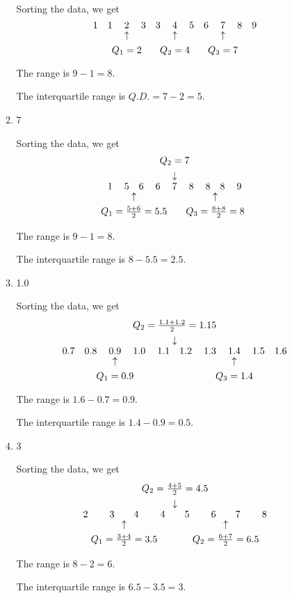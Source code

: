 \documentclass{report}
\newcommand\typel[2]{%
  \mathbin{\mathop{#1\kern0pt}%
    \limits_{\raisebox{3.6ex}{\hbox to0pt{\hss\strut$\uparrow$\hss}}\hbox to0pt{\hss#2\hss}}}
}
\newcommand\typem[2]{%
  \mathbin{\mathop{#1\kern0pt}%
    \limits^{\raisebox{3.6ex}{\hbox to0pt{\hss#2\hss}}\hbox to0pt{\hss\strut$\downarrow$\hss}}}
}
\begin{document}
\begin{multicols}{2}
\begin{enumerate}
\begin{enumerate}
                  Sorting the data, we get
                  \[1 \quad 1 \quad \typel{2}{$Q_1 = 2$} \quad 3 \quad 3 \quad \typel{4}{$Q_2 = 4$} \quad 5 \quad 6 \quad \typel{7}{$Q_3 = 7$} \quad 8 \quad 9\]

                  The range is $9 - 1 = 8$.

                  The interquartile range is $Q.D. = 7 - 2 = 5$.

            \item 7        
                  \sol{}

                  Sorting the data, we get
                  \[1 \typel{\quad 5 \quad 6 \quad}{$Q_1 = \frac{5 + 6}{2} = 5.5$} 6 \typem{\quad 7 \quad}{$Q_2 = 7$} 8 \typel{\quad 8 \quad 8 \quad}{$Q_3 = \frac{8 + 8}{2} = 8$} 9\]

                  The range is $9 - 1 = 8$.

                  The interquartile range is $8 - 5.5 = 2.5$.

            \item 1.0      \   
                  \sol{}

                  Sorting the data, we get
                  \[0.7 \quad 0.8 \quad \typel{0.9}{$Q_1 = 0.9$} \quad 1.0 \typem{ \quad 1.1 \quad 1.2 \quad }{$Q_2 = \frac{1.1 + 1.2}{2} = 1.15$} 1.3 \quad \typel{1.4}{$Q_3 = 1.4$} \quad 1.5 \quad 1.6\]

                  The range is $1.6 - 0.7 = 0.9$.

                  The interquartile range is $1.4 - 0.9 = 0.5$.

            \item 3       
                  \sol{}

                  Sorting the data, we get
                  \[2 \qquad \typel{3 \qquad 4}{$Q_1 = \frac{3 + 4}{2} = 3.5$} \qquad \typem{ 4 \qquad 5}{$Q_2 = \frac{4 +5}{2} = 4.5$} \qquad \typel{6 \qquad 7}{$Q_2 = \frac{6 + 7}{2} = 6.5$} \qquad 8\]

                  The range is $8 - 2 = 6$.

                  The interquartile range is $6.5 - 3.5 = 3$.
          \end{enumerate}


\end{enumerate}
\end{multicols}
\end{document}

